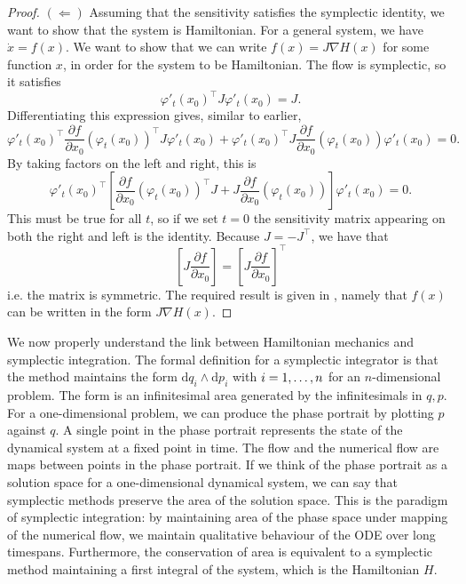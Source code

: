 \documentclass{report}
\theoremstyle{exampstyle} \newtheorem{example}[theorem]{Example}
\theoremstyle{exampstyle} \newtheorem{remark}[theorem]{Remark}
\theoremstyle{exampstyle} \newtheorem{definition}[theorem]{Definition}
\theoremstyle{exampstyle} \newtheorem{lemma}[theorem]{Lemma}
\theoremstyle{exampstyle} \newtheorem{proposition}[theorem]{Proposition}
\begin{document}
\begin{proof}
$(\Leftarrow)$ Assuming that the sensitivity satisfies the symplectic identity, we want to show that the system is Hamiltonian.
For a general system, we have $\dot{x} = f(x)$. We want to show that we can write $f(x) = J \nabla H(x)$ for some function $x$, in order for the system to be Hamiltonian.
The flow is symplectic, so it satisfies
\begin{equation*}
	\varphi'_t(x_0)^\top J \varphi'_t(x_0) = J. 
\end{equation*}
Differentiating this expression gives, similar to earlier,
\begin{equation*}
	\varphi'_t(x_0)^\top \frac{\partial f}{\partial x_0}(\varphi_t(x_0))^\top J \varphi'_t(x_0) + \varphi'_t(x_0)^\top J \frac{\partial f}{\partial x_0}(\varphi_t(x_0)) \varphi'_t(x_0) = 0.
\end{equation*}
By taking factors on the left and right, this is
\begin{equation*}
	\varphi'_t(x_0)^\top \left[ \frac{\partial f}{\partial x_0}(\varphi_t(x_0))^\top J + J \frac{\partial f}{\partial x_0}(\varphi_t(x_0)) \right] \varphi'_t(x_0) = 0.
\end{equation*}
This must be true for all $t$, so if we set $t=0$ the sensitivity matrix appearing on both the right and left is the identity.
Because $J = -J^\top$, we have that
\begin{equation*}
	\left[ J \frac{\partial f}{\partial x_0} \right]= \left[ J \frac{\partial f}{\partial x_0} \right]^\top
\end{equation*}
i.e. the matrix is symmetric. 
The required result is given in \cite{gni2006}, namely that $f(x)$ can be written in the form $J \nabla H(x)$.
\end{proof}

We now properly understand the link between Hamiltonian mechanics and symplectic integration.
The formal definition for a symplectic integrator is that the method maintains the form $\mathrm{d}q_i \wedge \mathrm{d}p_i$ with $i = 1, \mathellipsis, n$ for an $n$-dimensional problem.
The form is an infinitesimal area generated by the infinitesimals in $q, p$.
For a one-dimensional problem, we can produce the phase portrait by plotting $p$ against $q$.
A single point in the phase portrait represents the state of the dynamical system at a fixed point in time.
The flow and the numerical flow are maps between points in the phase portrait.
If we think of the phase portrait as a solution space for a one-dimensional dynamical system, we can say that symplectic methods preserve the area of the solution space.
This is the paradigm of symplectic integration: by maintaining area of the phase space under mapping of the numerical flow, we maintain qualitative behaviour of the ODE over long timespans.
Furthermore, the conservation of area is equivalent to a symplectic method maintaining a first integral of the system, which is the Hamiltonian $H$.
\end{document}

